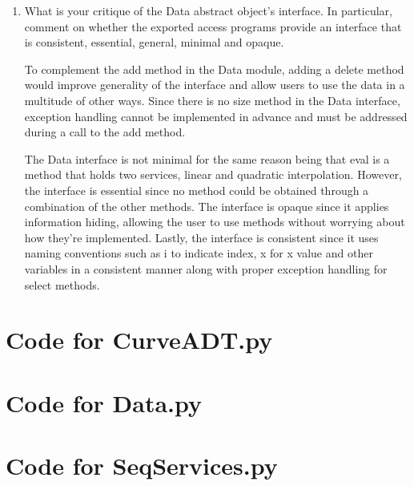 \documentclass[12pt]{article}
\begin{document}
\begin{enumerate}
\item What is your critique of the Data abstract object's interface.  In
  particular, comment on whether the exported access programs provide an
  interface that is consistent, essential, general, minimal and opaque.

To complement the add method in the Data module, adding a delete method would improve generality of the interface and allow users to use the data in a multitude of other ways. Since there is no size method in the Data interface, exception handling cannot be implemented in advance and must be addressed during a call to the add method. 

The Data interface is not minimal for the same reason being that eval is a method that holds two services, linear and quadratic interpolation. However, the interface is essential since no method could be obtained through a combination of the other methods. The interface is opaque since it applies information hiding, allowing the user to use methods without worrying about how they're implemented. Lastly, the interface is consistent since it uses naming conventions such as i to indicate index, x for x value and other variables in a consistent manner along with proper exception handling for select methods. 

\end{enumerate}

\newpage

\lstset{language=Python, basicstyle=\tiny, breaklines=true, showspaces=false,
  showstringspaces=false, breakatwhitespace=true}

\def\thesection{\Alph{section}}

\section{Code for CurveADT.py}

\noindent 

\newpage

\section{Code for Data.py}

\noindent 

\newpage

\section{Code for SeqServices.py}
\end{document}
